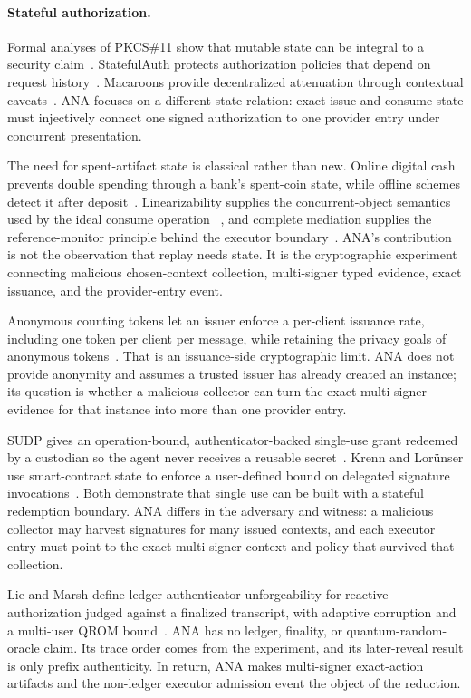 \documentclass[10pt]{article}
\begin{document}
\paragraph{Stateful authorization.}
Formal analyses of PKCS\#11 show that mutable state can be integral to a security
claim~\cite{pkcs11state}. StatefulAuth protects authorization policies that
depend on request history~\cite{statefulauth}. Macaroons provide decentralized
attenuation through contextual caveats~\cite{macaroons}. ANA focuses on a
different state relation: exact issue-and-consume state must injectively connect
one signed authorization to one provider entry under concurrent presentation.

The need for spent-artifact state is classical rather than new. Online digital
cash prevents double spending through a bank's spent-coin state, while offline
schemes detect it after deposit~\cite{chaumcash90}. Linearizability supplies the
concurrent-object semantics used by the ideal consume operation
~\cite{linearizability90}, and complete mediation supplies the reference-monitor
principle behind the executor boundary~\cite{saltzerschroeder75}. ANA's
contribution is not the observation that replay needs state. It is the
cryptographic experiment connecting malicious chosen-context collection,
multi-signer typed evidence, exact issuance, and the provider-entry event.

Anonymous counting tokens let an issuer enforce a per-client issuance rate,
including one token per client per message, while retaining the privacy goals of
anonymous tokens~\cite{act23}. That is an issuance-side cryptographic limit.
ANA does not provide anonymity and assumes a trusted issuer has already created
an instance; its question is whether a malicious collector can turn the exact
multi-signer evidence for that instance into more than one provider entry.

SUDP gives an operation-bound, authenticator-backed single-use grant redeemed by
a custodian so the agent never receives a reusable secret~\cite{sudp26}.
Krenn and Lor\"unser use smart-contract state to enforce a user-defined bound on
delegated signature invocations~\cite{singleusesig22}. Both demonstrate that
single use can be built with a stateful redemption boundary. ANA differs in the
adversary and witness: a malicious collector may harvest signatures for many
issued contexts, and each executor entry must point to the exact multi-signer
context and policy that survived that collection.

Lie and Marsh define ledger-authenticator unforgeability for reactive
authorization judged against a finalized transcript, with adaptive corruption
and a multi-user QROM bound~\cite{ledgerauth26}. ANA has no ledger, finality, or
quantum-random-oracle claim. Its trace order comes from the experiment, and its
later-reveal result is only prefix authenticity. In return, ANA makes
multi-signer exact-action artifacts and the non-ledger executor admission event
the object of the reduction.
\end{document}
